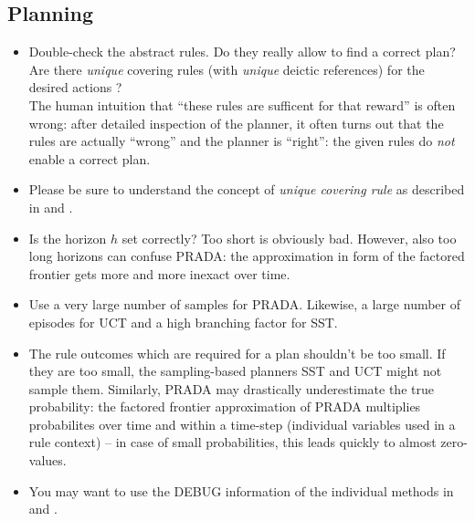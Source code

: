 \documentclass[10pt,twoside,twocolumn,fleqn]{article}
\begin{document}
\subsection{Planning}
\begin{itemize}
\item Double-check the abstract rules. Do they really allow to find a
correct plan? Are there \emph{unique} covering rules (with \emph{unique}
deictic references) for the desired actions ? \\
The human intuition that ``these rules are sufficent for that reward'' is
often wrong: after detailed inspection of the planner, it often turns out
that the rules are actually ``wrong'' and the planner is ``right'': the
given rules do \emph{not} enable a correct plan.

\item Please be sure to understand the concept of \emph{unique covering
rule} as described in \citet{pasula07ai} and \citet{lang-toussaint-10jair}.

\item Is the horizon $h$ set correctly? Too short is obviously bad.
However, also too long horizons can confuse PRADA: the approximation in
form of the factored frontier gets more and more inexact over time.

\item Use a very large number of samples  for PRADA.
Likewise, a large number of episodes for UCT and a high branching factor
for SST.

\item The rule outcomes which are required for a plan shouldn't be too
small. If they are too small, the sampling-based planners SST and UCT	
might not sample them. Similarly, PRADA may drastically underestimate
the true probability: the factored frontier approximation of PRADA
multiplies probabilites over time and within a time-step (individual
variables used in a rule context) -- in case of small probabilities, this
leads quickly to almost zero-values.

\item You may want to use the DEBUG information of the individual methods
in  and .
\end{itemize}
\end{document}
